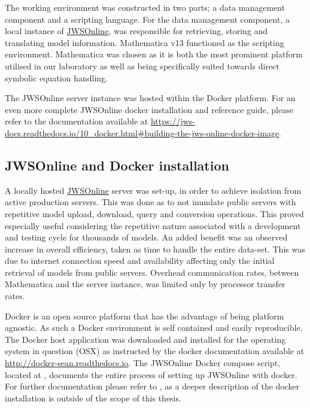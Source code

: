 The working environment was constructed in two parts; a data management component and a scripting language. For the data management component, a local instance of \href{https://jjj.bio.vu.nl}{JWSOnline}, was responsible for retrieving, storing and translating model information. Mathematica v13 functioned as the scripting environment. Mathematica was chosen as it is both the most prominent platform utilised in our laboratory as well as being specifically suited towards direct symbolic equation handling. 

The JWSOnline server instance was hosted within the Docker platform. For an even more complete JWSOnline docker installation and reference guide, please refer to the documentation available at \href{https://jws-docs.readthedocs.io/10_docker.html#building-the-jws-online-docker-image}{https://jws-docs.readthedocs.io/10_docker.html#building-the-jws-online-docker-image}.

\subsection{JWSOnline and Docker installation} \label{Docker Installation}
A locally hosted \href{https://jjj.bio.vu.nl}{JWSOnline} server was set-up, in order to achieve isolation from active production servers. This was done as to not inundate public servers with repetitive model upload, download, query and conversion operations. This proved especially useful considering the repetitive nature associated with a development and testing cycle for thousands of models. An added benefit was an observed increase in overall efficiency, taken as time to handle the entire data-set. This was due to internet connection speed and availability affecting only the initial retrieval of models from public servers. Overhead communication rates, between Mathematica and the server instance, was limited only by processor transfer rates. 

Docker is an open source platform that has the advantage of being platform agnostic. As such a Docker environment is self contained and easily reproducible. The Docker host application was downloaded and installed for the operating system in question (OSX) as instructed by the docker documentation available at \href{http://docker-sean.readthedocs.io}{http://docker-sean.readthedocs.io}. The JWSOnline Docker compose script, located at \href{http://jws-docs.readthedocs.io/10_docker.html#building-the-jws-online-docker-image}, documents the entire process of setting up JWSOnline with docker. For further documentation please refer to \href{https://docs.docker.com/compose/compose-file/#compose-file-structure-and-examples}, as a deeper description of the docker installation is outside of the scope of this thesis.


